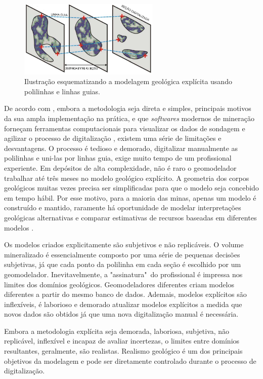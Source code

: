 \begin{figure}[H]
    \centering
	\caption{\label{explicitmodeling}Ilustração esquematizando a modelagem geológica explícita usando polilinhas e linhas guias.}
	\includegraphics[width=0.6\textwidth]{capitulo_1/imagens/explicitmodeling}
\end{figure}

De acordo com , embora a metodologia seja direta e simples, principais motivos da sua ampla implementação na prática, e que \textit{softwares} modernos de mineração forneçam ferramentas computacionais para visualizar os dados de sondagem e agilizar o processo de digitalização \cite{silvaenhancedgeomodeling}, existem uma série de limitações e desvantagens. O processo é tedioso e demorado, digitalizar manualmente as polilinhas e uni-las por linhas guia, exige muito tempo de um profissional experiente. Em depósitos de alta complexidade, não é raro o geomodelador trabalhar até três meses no modelo geológico explícito. A geometria dos corpos geológicos muitas vezes precisa ser simplificadas para que o modelo seja concebido em tempo hábil. Por esse motivo, para a maioria das minas, apenas um modelo é construído e mantido, raramente há oportunidade de modelar interpretações geológicas alternativas e comparar estimativas de recursos baseadas em diferentes modelos \cite{cowan2003practical}.

Os modelos criados explicitamente são subjetivos e não replicáveis. O volume mineralizado é essencialmente composto por uma série de pequenas decisões subjetivas, já que cada ponto da polilinha em cada seção é escolhido por um geomodelador. Inevitavelmente, a "assinatura"\ do profissional é impressa nos limites dos domínios geológicos. Geomodeladores diferentes criam modelos diferentes a partir do mesmo banco de dados. Ademais, modelos explícitos são inflexíveis, é laborioso e demorado atualizar modelos explícitos a medida que novos dados são obtidos já que uma nova digitalização manual é necessária.

Embora a metodologia explícita seja demorada, laboriosa, subjetiva, não replicável, inflexível e incapaz de avaliar incertezas, o limites entre domínios resultantes, geralmente, são realistas. Realismo geológico é um dos principais objetivos da modelagem e pode ser diretamente controlado durante o processo de digitalização.

